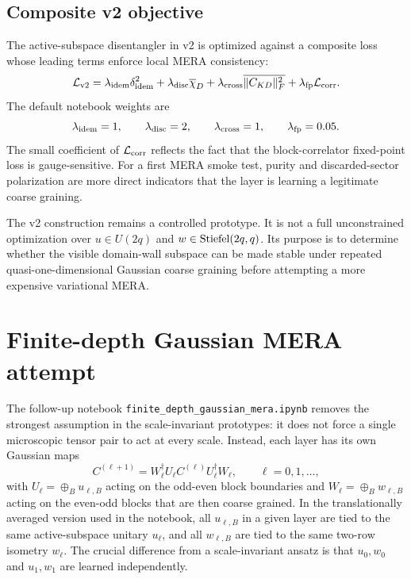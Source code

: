 \documentclass[aps,prb,twocolumn,floatfix]{revtex4-2}
\begin{document}
\subsection{Composite v2 objective}

The active-subspace disentangler in v2 is optimized against a composite loss
whose leading terms enforce local MERA consistency:
\begin{equation}
  \mathcal{L}_{\rm v2}
  =
  \lambda_{\rm idem}\delta_{\rm idem}^2
  +\lambda_{\rm disc}\overline{\chi}_{D}
  +\lambda_{\rm cross}\overline{\|C_{KD}\|_F^2}
  +\lambda_{\rm fp}\mathcal{L}_{\rm corr}.
  \label{eq:v2-loss}
\end{equation}
The default notebook weights are
\begin{equation}
  \lambda_{\rm idem}=1,\qquad
  \lambda_{\rm disc}=2,\qquad
  \lambda_{\rm cross}=1,\qquad
  \lambda_{\rm fp}=0.05.
\end{equation}
The small coefficient of \(\mathcal{L}_{\rm corr}\) reflects the fact that the
block-correlator fixed-point loss is gauge-sensitive.  For a first MERA smoke
test, purity and discarded-sector polarization are more direct indicators that
the layer is learning a legitimate coarse graining.

The v2 construction remains a controlled prototype.  It is not a full
unconstrained optimization over \(u\in U(2q)\) and
\(w\in{\rm Stiefel}(2q,q)\).  Its purpose is to determine whether the visible
domain-wall subspace can be made stable under repeated quasi-one-dimensional
Gaussian coarse graining before attempting a more expensive variational MERA.

\section{Finite-depth Gaussian MERA attempt}

The follow-up notebook
\texttt{finite\_depth\_gaussian\_mera.ipynb} removes the strongest assumption
in the scale-invariant prototypes: it does not force a single microscopic
tensor pair to act at every scale.  Instead, each layer has its own Gaussian
maps
\begin{equation}
  C^{(\ell+1)}
  =
  W_\ell^\dagger U_\ell C^{(\ell)} U_\ell^\dagger W_\ell,
  \qquad
  \ell=0,1,\ldots ,
  \label{eq:finite-depth-layer}
\end{equation}
with \(U_\ell=\oplus_B u_{\ell,B}\) acting on the odd-even block boundaries and
\(W_\ell=\oplus_B w_{\ell,B}\) acting on the even-odd blocks that are then
coarse grained.  In the translationally averaged version used in the notebook,
all \(u_{\ell,B}\) in a given layer are tied to the same active-subspace
unitary \(u_\ell\), and all \(w_{\ell,B}\) are tied to the same two-row
isometry \(w_\ell\).  The crucial difference from a scale-invariant ansatz is
that \(u_0,w_0\) and \(u_1,w_1\) are learned independently.
\end{document}
